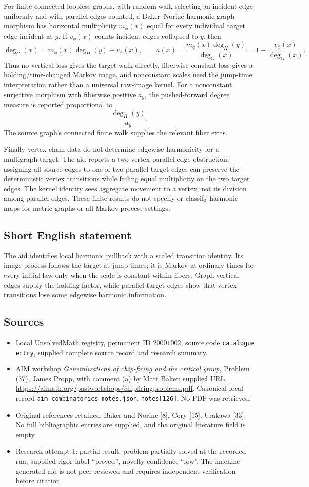 \documentclass[11pt]{article}
\begin{document}
For finite connected loopless graphs, with random walk selecting an incident edge uniformly and with parallel edges counted, a Baker--Norine harmonic graph morphism has horizontal multiplicity $m_\phi(x)$ equal for every individual target edge incident at $y$. If $v_\phi(x)$ counts incident edges collapsed to $y$, then
\[
 \deg_G(x)=m_\phi(x)\deg_H(y)+v_\phi(x),\qquad
 a(x)=\frac{m_\phi(x)\deg_H(y)}{\deg_G(x)}
     =1-\frac{v_\phi(x)}{\deg_G(x)}.
\]
Thus no vertical loss gives the target walk directly, fiberwise constant loss gives a holding/time-changed Markov image, and nonconstant scales need the jump-time interpretation rather than a universal raw-image kernel. For a nonconstant surjective morphism with fiberwise positive $a_y$, the pushed-forward degree measure is reported proportional to
\[
 \frac{\deg_H(y)}{a_y}.
\]
The source graph's connected finite walk supplies the relevant fiber exits.

Finally vertex-chain data do not determine edgewise harmonicity for a multigraph target. The aid reports a two-vertex parallel-edge obstruction: assigning all source edges to one of two parallel target edges can preserve the deterministic vertex transitions while failing equal multiplicity on the two target edges. The kernel identity sees aggregate movement to a vertex, not its division among parallel edges. These finite results do not specify or classify harmonic maps for metric graphs or all Markov-process settings.
\subsection{Short English statement}
The aid identifies local harmonic pullback with a scaled transition identity. Its image process follows the target at jump times; it is Markov at ordinary times for every initial law only when the scale is constant within fibers. Graph vertical edges supply the holding factor, while parallel target edges show that vertex transitions lose some edgewise harmonic information.
\subsection{Sources}
\begin{itemize}
\item Local UnsolvedMath registry, permanent ID $20001002$, source code \texttt{catalogue entry}, supplied complete source record and research summary.
\item AIM workshop \emph{Generalizations of chip-firing and the critical group}, Problem (37), James Propp, with comment (a) by Matt Baker; supplied URL \url{https://aimath.org/pastworkshops/chipfiringproblems.pdf}. Canonical local record \texttt{aim-combinatorics-notes.json}, \texttt{notes[126]}. No PDF was retrieved.
\item Original references retained: Baker and Norine [8], Cory [15], Urakawa [33]. No full bibliographic entries are supplied, and the original literature field is empty.
\item Research attempt 1: partial result; problem partially solved at the recorded run; supplied rigor label ``proved'', novelty confidence ``low''. The machine-generated aid is not peer reviewed and requires independent verification before citation.
\end{itemize}
\end{document}

